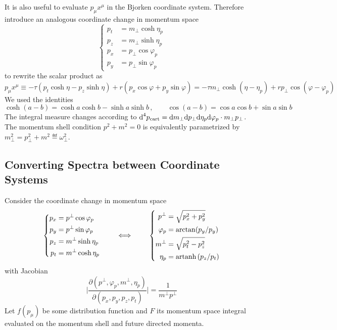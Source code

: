 It is also useful to evaluate $p_\mu x^\mu$ in the Bjorken coordinate system. Therefore introduce an analogous coordinate change in momentum space
\begin{equation}
    \left\{\begin{split}
        p_t&=m_\perp\cosh\eta_p\\
        p_z&=m_\perp\sinh\eta_p\\
        p_x&=p_\perp\cos\varphi_p\\
        p_y&=p_\perp\sin\varphi_p
    \end{split}\right.
\end{equation}
to rewrite the scalar product as
\begin{equation}
    p_\mu x^\mu\equiv-\tau(p_t\cosh\eta-p_z\sinh\eta)+r(p_x\cos\varphi+p_y\sin\varphi)=-\tau m_\perp\cosh(\eta-\eta_p)+r p_\perp\cos(\varphi-\varphi_p)
\end{equation}
We used the identities
\begin{equation}
    \cosh(a-b)=\cosh a\cosh b-\sinh a\sinh b\,,\qquad\cos(a-b)=\cos a\cos b+\sin a\sin b
\end{equation}
The integral measure changes according to $\text{d}^4p_{\text{cart}}=\text{d} m_\perp\text{d} p_\perp\text{d}\eta_p\text{d}\varphi_p\cdot m_\perp p_\perp$. The momentum shell condition $p^2+m^2=0$ is equivalently parametrized by $m_\perp^2=p_\perp^2+m^2\eqdef \omega_\perp^2$.

\subsection{Converting Spectra between Coordinate Systems}
\label{sec:SpectraCoordinateSystem}

Consider the coordinate change in momentum space
\begin{equation}
    \left\{
    \begin{split}
        p_x&=p^\perp\cos\varphi_p\\
        p_y&=p^\perp\sin\varphi_p\\
        p_z&=m^\perp\sinh\eta_p\\
        p_t&=m^\perp\cosh\eta_p
    \end{split}
    \right.\qquad\iff\qquad
    \left\{
    \begin{split}
        p^\perp&=\sqrt{p_x^2+p_y^2}\\
        \varphi_p&=\arctan(p_y/p_y)\\
        m^\perp&=\sqrt{p_t^2-p_z^2}\\
        \eta_p&={\text{artanh}\,}(p_z/p_t)
    \end{split}
    \right.
\end{equation}
with Jacobian
\begin{equation}
    \big\vert\frac{\partial(p^\perp,\varphi_p,m^\perp,\eta_p)}{\partial(p_x,p_y,p_z,p_t)}\big\vert=\frac{1}{m^\perp p^\perp}
\end{equation}
Let $f(p_\mu)$ be some distribution function and $F$ its momentum space integral evaluated on the momentum shell and future directed momenta.


